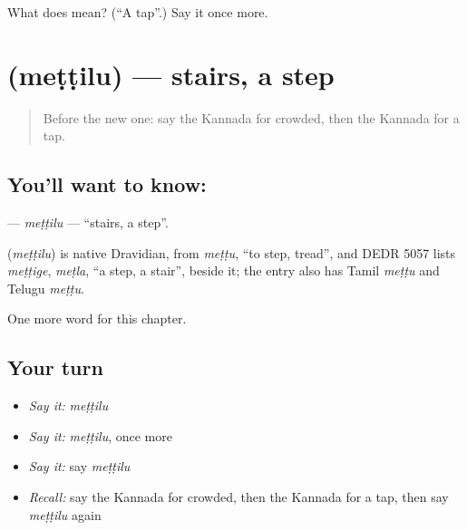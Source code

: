 \begin{tcolorbox}[breakable,colback=teal!4,colframe=teal!35!black,title={Before you move on}]
What does  mean? (\textquotedblleft{}A tap\textquotedblright{}.) Say it once more.
\end{tcolorbox}
\section[\texorpdfstring{\kn{ಮೆಟ್ಟಿಲು} (meṭṭilu)}{ಮೆಟ್ಟಿಲು (meṭṭilu)}]{ (meṭṭilu) — stairs, a step}

\label{lesson:KA-C257-mettilu}



\begin{quote}
Before the new one: say the Kannada for crowded, then the Kannada for a tap.
\end{quote}

\subsection*{You'll want to know: }
\textbf{} — \emph{meṭṭilu} — \textquotedblleft{}stairs, a step\textquotedblright{}.

\begin{cousinweb}
\textbf{} (\emph{meṭṭilu}) is native Dravidian, from \emph{meṭṭu}, \textquotedblleft{}to step, tread\textquotedblright{}, and DEDR 5057 lists \emph{meṭṭige}, \emph{meṭla}, \textquotedblleft{}a step, a stair\textquotedblright{}, beside it; the entry also has Tamil \emph{meṭṭu} and Telugu \emph{meṭṭu}.
\end{cousinweb}

\begin{grammarlens}[title={What you've built}]
One more word for this chapter.
\end{grammarlens}

\subsection*{Your turn}
\begin{itemize}
\raggedright
  \item \emph{Say it:} \emph{meṭṭilu}
  \item \emph{Say it:} \emph{meṭṭilu}, once more
  \item \emph{Say it:} say \emph{meṭṭilu}
  \item \emph{Recall:} say the Kannada for crowded, then the Kannada for a tap, then say \emph{meṭṭilu} again
\end{itemize}

